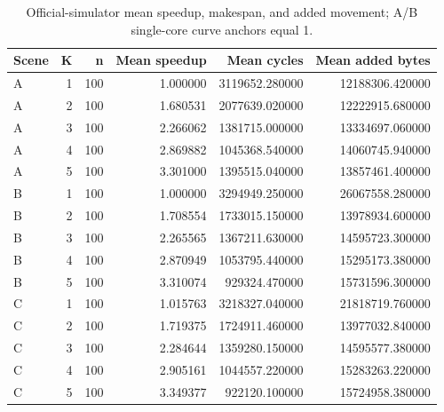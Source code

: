 \begin{table}[htbp]
\centering
\caption{Official-simulator mean speedup, makespan, and added movement; A/B single-core curve anchors equal 1.}
\begin{tabular}{lrrrrr}
\toprule
Scene & K & n & Mean speedup & Mean cycles & Mean added bytes \\
\midrule
A & 1 & 100 & 1.000000 & 3119652.280000 & 12188306.420000 \\
A & 2 & 100 & 1.680531 & 2077639.020000 & 12222915.680000 \\
A & 3 & 100 & 2.266062 & 1381715.000000 & 13334697.060000 \\
A & 4 & 100 & 2.869882 & 1045368.540000 & 14060745.940000 \\
A & 5 & 100 & 3.301000 & 1395515.040000 & 13857461.400000 \\
B & 1 & 100 & 1.000000 & 3294949.250000 & 26067558.280000 \\
B & 2 & 100 & 1.708554 & 1733015.150000 & 13978934.600000 \\
B & 3 & 100 & 2.265565 & 1367211.630000 & 14595723.300000 \\
B & 4 & 100 & 2.870949 & 1053795.440000 & 15295173.380000 \\
B & 5 & 100 & 3.310074 & 929324.470000 & 15731596.300000 \\
C & 1 & 100 & 1.015763 & 3218327.040000 & 21818719.760000 \\
C & 2 & 100 & 1.719375 & 1724911.460000 & 13977032.840000 \\
C & 3 & 100 & 2.284644 & 1359280.150000 & 14595577.380000 \\
C & 4 & 100 & 2.905161 & 1044557.220000 & 15283263.220000 \\
C & 5 & 100 & 3.349377 & 922120.100000 & 15724958.380000 \\
\bottomrule
\end{tabular}
\end{table}
